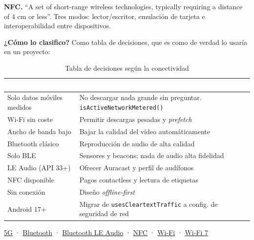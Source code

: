 \documentclass[11pt,a4paper]{article}
\newcommand{\code}[1]{\texttt{\color{primary}#1}}
\newcommand{\campo}[1]{\textbf{\color{primary}#1}}
\begin{document}
	\textbf{NFC.} \enquote{A set of short-range wireless technologies, typically requiring a distance of 4 cm or less}. Tres modos: lector/escritor, emulación de tarjeta e interoperabilidad entre dispositivos.
	
	\campo{¿Cómo lo clasifico?} Como tabla de decisiones, que es como de verdad lo usaría en un proyecto:
	
	\begin{table}[htbp]
		\centering
		\small
		\begin{tabularx}{\textwidth}{@{}>{\RaggedRight\arraybackslash}p{5cm} >{\RaggedRight\arraybackslash}X@{}}
			\toprule
			\rowcolor{primary}
			\textcolor{white}{\sffamily\bfseries Situación} & \textcolor{white}{\sffamily\bfseries Decisión de diseño} \\
			\midrule
			Solo datos móviles medidos & No descargar nada grande sin preguntar. \code{isActiveNetworkMetered()} \\
			\rowcolor{soft}
			Wi-Fi sin coste & Permitir descargas pesadas y \emph{prefetch} \\
			Ancho de banda bajo & Bajar la calidad del vídeo automáticamente \\
			\rowcolor{soft}
			Bluetooth clásico & Reproducción de audio de alta calidad \\
			Solo BLE & Sensores y beacons; nada de audio alta fidelidad \\
			\rowcolor{soft}
			LE Audio (API 33+) & Ofrecer Auracast y perfil de audífonos \\
			NFC disponible & Pagos contactless y lectura de etiquetas \\
			\rowcolor{soft}
			Sin conexión & Diseño \emph{offline-first} \\
			Android 17+ & Migrar de \code{usesCleartextTraffic} a config. de seguridad de red \\
			\bottomrule
		\end{tabularx}
		\caption{Tabla de decisiones según la conectividad}
	\end{table}
	
	\begin{fuentesbox}
		\href{https://developer.android.com/develop/connectivity/5g}{5G} ·
		\href{https://developer.android.com/develop/connectivity/bluetooth}{Bluetooth} ·
		\href{https://developer.android.com/develop/connectivity/bluetooth/ble-audio/overview}{Bluetooth LE Audio} ·
		\href{https://developer.android.com/develop/connectivity/nfc}{NFC} ·
		\href{https://developer.android.com/develop/connectivity/wifi}{Wi-Fi} ·
		\href{https://source.android.com/docs/core/connect/wifi-7}{Wi-Fi 7}
	\end{fuentesbox}
	
\end{document}

